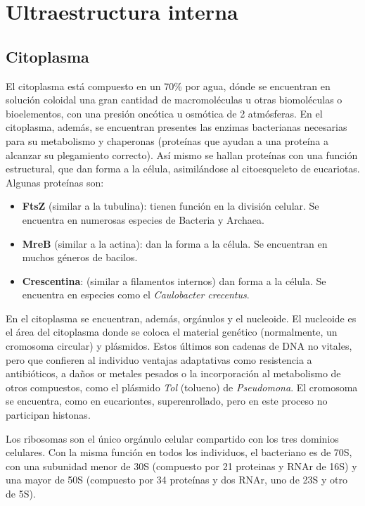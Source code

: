 \chapter{Ultraestructura interna}
\section{Citoplasma}
El citoplasma está compuesto en un 70\% por agua, dónde se encuentran en solución coloidal una gran cantidad de macromoléculas u otras biomoléculas o bioelementos, con una presión oncótica u osmótica de 2 atmósferas. En el citoplasma, además, se encuentran presentes las enzimas bacterianas necesarias para su metabolismo y chaperonas (proteínas que ayudan a una proteína a alcanzar su plegamiento correcto). Así mismo se hallan proteínas con una función estructural, que dan forma a la célula, asimilándose al citoesqueleto de eucariotas. Algunas proteínas son:
\begin{itemize}[itemsep=0pt,parsep=0pt,topsep=0pt,partopsep=0pt]
	\item \textbf{FtsZ} (similar a la tubulina): tienen función en la división celular. Se encuentra en numerosas especies de Bacteria y Archaea.
	\item \textbf{MreB} (similar a la actina): dan la forma a la célula. Se encuentran en muchos géneros de bacilos.
	\item \textbf{Crescentina}: (similar a filamentos internos) dan forma a la célula. Se encuentra en especies como el \textit{Caulobacter crecentus}.
\end{itemize}

En el citoplasma se encuentran, además, orgánulos y el nucleoide. El nucleoide es el área del citoplasma donde se coloca el material genético (normalmente, un cromosoma circular) y plásmidos. Estos últimos son cadenas de DNA no vitales, pero que confieren al individuo ventajas adaptativas como resistencia a antibióticos, a daños or metales pesados o la incorporación al metabolismo de otros compuestos, como el plásmido \textit{Tol} (tolueno) de \textit{Pseudomona}. El cromosoma se encuentra, como en eucariontes, superenrollado, pero en este proceso no participan histonas.

Los ribosomas son el único orgánulo celular compartido con los tres dominios celulares. Con la misma función en todos los individuos, el bacteriano es de 70S, con una subunidad menor de 30S (compuesto por 21 proteinas y RNAr de 16S) y una mayor de 50S (compuesto por 34 proteínas y dos RNAr, uno de 23S y otro de 5S).

